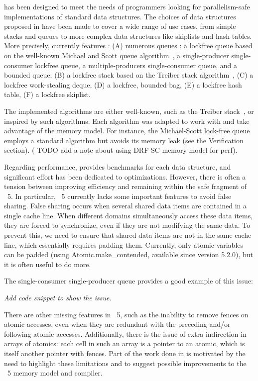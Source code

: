 \documentclass[a4paper, 11pt]{article}
\begin{document}
\Saturn has been designed to meet the needs of programmers looking for parallelism-safe implementations of standard data structures. The choices of data structures proposed in have been made to cover a wide range of use cases, from simple stacks and queues to more complex data structures like skiplists and hash tables.  More precisely, \Saturn currently features : 
(A) numerous queues : a lockfree queue based on the well-known Michael and Scott queue algorithm~\cite{michael1996simple}, a single-producer single-consumer lockfree queue, a multiple-producers single-consumer queue, and a bounded queue; 
(B) a lockfree stack based on the Treiber stack algorithm~\cite{treiber1986systems},
(C) a lockfree work-stealing deque,
(D) a lockfree, bounded bag,
(E) a lockfree hash table, 
(F) a lockfree skiplist.

The implemented algorithms are either well-known, such as the Treiber stack~\cite{treiber1986systems}, or inspired by such algorithms. Each algorithm was adapted to work with and take advantage of the \OCaml memory model. For instance, the Michael-Scott lock-free queue~\cite{michael1996simple} employs a standard algorithm but avoids its memory leak (see the Verification section). ( TODO add a note about using DRF-SC memory model for perf).

Regarding performance, \Saturn provides benchmarks for each data structure, and significant effort has been dedicated to optimizations. However, there is often a tension between improving efficiency and remaining within the safe fragment of \OCaml~5. In particular, \OCaml~5 currently lacks some important features to avoid false sharing. False sharing occurs when several shared data items are contained in a single cache line. When different domains simultaneously access these data items, they are forced to synchronize, even if they are not modifying the same data. To prevent this, we need to ensure that shared data items are not in the same cache line, which essentially requires padding them. Currently, only atomic variables can be padded (using Atomic.make\_contended, available since version 5.2.0), but it is often useful to do more. 

The single-consumer single-producer queue provides a good example of this issue: 

\emph{Add code snippet to show the issue}.


There are other missing features in \OCaml~5, such as the inability to remove fences on atomic accesses, even when they are redundant with the preceding and/or following atomic accesses. Additionally, there is the issue of extra indirection in arrays of atomics: each cell in such an array is a pointer to an atomic, which is itself another pointer with fences. Part of the  work done in \Saturn is motivated by the need to highlight these limitations and to suggest possible improvements to the \OCaml~5 memory model and compiler.
\end{document}
